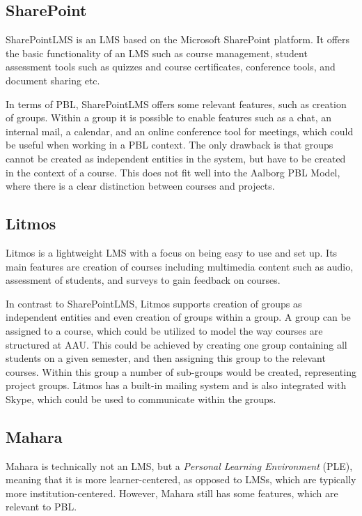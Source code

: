 \subsection{SharePoint}
SharePointLMS \citep{sharepointlms} is an LMS based on the Microsoft SharePoint platform. 
It offers the basic functionality of an LMS such as course management, student assessment tools such as quizzes and course certificates, conference tools, and document sharing etc.

In terms of PBL, SharePointLMS offers some relevant features, such as creation of groups.
Within a group it is possible to enable features such as a chat, an internal mail, a calendar, and an online conference tool for meetings, which could be useful when working in a PBL context.
The only drawback is that groups cannot be created as independent entities in the system, but have to be created in the context of a course.
This does not fit well into the Aalborg PBL Model, where there is a clear distinction between courses and projects.

\subsection{Litmos}
Litmos \citep{litmos} is a lightweight LMS with a focus on being easy to use and set up.
Its main features are creation of courses including multimedia content such as audio, assessment of students, and surveys to gain feedback on courses.

In contrast to SharePointLMS, Litmos supports creation of groups as independent entities and even creation of groups within a group.
A group can be assigned to a course, which could be utilized to model the way courses are structured at AAU.
This could be achieved by creating one group containing all students on a given semester, and then assigning this group to the relevant courses.
Within this group a number of sub-groups would be created, representing project groups.
Litmos has a built-in mailing system and is also integrated with Skype, which could be used to communicate within the groups.


\subsection{Mahara}
Mahara \citep{mahara} is technically not an LMS, but a \emph{Personal Learning Environment} (PLE), meaning that it is more learner-centered, as opposed to LMSs, which are typically more institution-centered.
However, Mahara still has some features, which are relevant to PBL.

